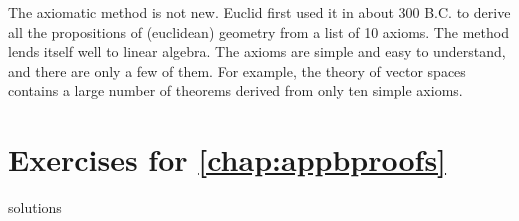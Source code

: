 The
 axiomatic method is not new. Euclid first used it in about 300 B.C. to 
derive all the propositions of (euclidean) geometry from a list of 10 
axioms. The method lends itself well to linear algebra. The axioms are 
simple and easy to understand, and there are only a few of them. For 
example, the theory of vector spaces contains a large number of theorems
 derived from only ten simple axioms.

\vspace*{-1em}
\section*{Exercises for \ref{chap:appbproofs}}

\begin{Filesave}{solutions}
\end{Filesave}

